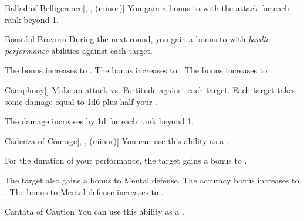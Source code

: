 {\begin{freeability}{Ballad of Belligerence}[, ,  (minor)]
                \rankline
                You gain a  bonus to  with the attack for each rank beyond 1.
            \end{freeability}

            \begin{freeability}{Boastful Bravura}
                During the next round, you gain a  bonus to  with \textit{bardic performance} abilities against each target.

                \rankline
                 The bonus increases to .
                 The bonus increases to .
                 The bonus increases to .
            \end{freeability}

            \begin{freeability}{Cacaphony}[]
                Make an attack vs. Fortitude against each target.
                \hit Each target takes sonic damage equal to 1d6 plus half your .

                \rankline
                The damage increases by \plus1d for each rank beyond 1.
            \end{freeability}

            \begin{freeability}{Cadenza of Courage}[, ,  (minor)]
                You can use this ability as a .

                For the duration of your performance, the target gains a  bonus to .

                \rankline
                 The target also gains a  bonus to Mental defense.
                 The accuracy bonus increases to .
                 The bonus to Mental defense increases to .
            \end{freeability}

            \begin{freeability}{Cantata of Caution}
                You can use this ability as a .


\end{freeability}}
